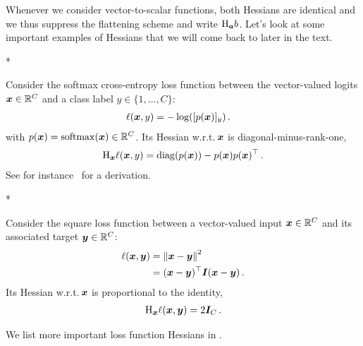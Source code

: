 Whenever we consider vector-to-scalar functions, both Hessians are identical and we thus suppress the flattening scheme and write $\mathrm{H}_{{\bm{a}}}b$. Let's look at some important examples of Hessians that we will come back to later in the text.

\switchcolumn[1]*
\switchcolumn[0]

\begin{example}
  Consider the softmax cross-entropy loss function between the vector-valued logits ${\bm{x}} \in {\mathbb{R}}^C$ and a class label $y \in \{1, \dots, C\}$:
  \begin{align*}
    \ell({\bm{x}}, y)
    &=
      -\log([p({\bm{x}})]_y)\,.
  \end{align*}
  with $p({\bm{x}}) = \mathrm{softmax}({\bm{x}}) \in {\mathbb{R}}^C$.
  Its Hessian w.r.t.\,${\bm{x}}$ is diagonal-minus-rank-one,
  \begin{align*}
    \mathrm{H}_{{\bm{x}}} \ell({\bm{x}}, y)
    =
    \operatorname{diag}(p({\bm{x}})) - p({\bm{x}}) p({\bm{x}})^\top\,.
  \end{align*}
  See for instance~\cite{dangel2020modular} for a derivation.
\end{example}

\switchcolumn[1]*

\switchcolumn[0]
\begin{example}
  Consider the square loss function between a vector-valued input ${\bm{x}} \in {\mathbb{R}}^C$ and its associated target ${\bm{y}} \in {\mathbb{R}}^C$:
  \begin{align*}
    \ell({\bm{x}}, {\bm{y}})
    &=
      \left\lVert
      {\bm{x}} - {\bm{y}}
      \right\rVert^2
      \\
      &=
      ({\bm{x}} - {\bm{y}})^{\top} {\bm{I}} ({\bm{x}} - {\bm{y}})\,.
  \end{align*}
  Its Hessian w.r.t.\,${\bm{x}}$ is proportional to the identity,
  \begin{align*}
    \mathrm{H}_{{\bm{x}}} \ell({\bm{x}}, {\bm{y}})
    =
    2 {\bm{I}}_C\,.
  \end{align*}
\end{example}

We list more important loss function Hessians in .

